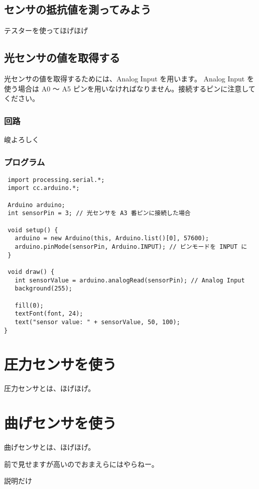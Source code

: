 \documentclass[11pt,a4paper]{jarticle}
\begin{document}

\subsection*{センサの抵抗値を測ってみよう}
テスターを使ってほげほげ

\subsection*{光センサの値を取得する}
光センサの値を取得するためには、Analog Input を用います。
Analog Input を使う場合は A0 〜 A5 ピンを用いなければなりません。接続するピンに注意してください。

\subsubsection*{回路}
峻よろしく

\subsubsection*{プログラム}
\begin{lstlisting}
 import processing.serial.*;
 import cc.arduino.*;
 
 Arduino arduino;
 int sensorPin = 3; // 光センサを A3 番ピンに接続した場合
 
 void setup() {
   arduino = new Arduino(this, Arduino.list()[0], 57600);
   arduino.pinMode(sensorPin, Arduino.INPUT); // ピンモードを INPUT に
 }

 void draw() {
   int sensorValue = arduino.analogRead(sensorPin); // Analog Input
   background(255);

   fill(0);
   textFont(font, 24);
   text("sensor value: " + sensorValue, 50, 100);
}
\end{lstlisting}


\section{圧力センサを使う}
圧力センサとは、ほげほげ。

\section{曲げセンサを使う}
曲げセンサとは、ほげほげ。

前で見せますが高いのでおまえらにはやらねー。

説明だけ
\end{document}
